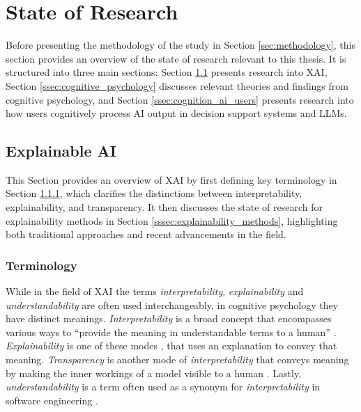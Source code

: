 \section{State of Research} \label{sec:state_of_research}

Before presenting the methodology of the study in Section \ref{sec:methodology}, this section provides an overview of the state of research relevant to this thesis. It is structured into three main sections: Section \ref{ssec:xai} presents research into \ac{XAI}, Section \ref{ssec:cognitive_psychology} discusses relevant theories and findings from cognitive psychology, and Section \ref{ssec:cognition_ai_users} presents research into how users cognitively process \ac{AI} output in decision support systems and \acp{LLM}.

\subsection{Explainable AI} \label{ssec:xai}

This Section provides an overview of \ac{XAI} by first defining key terminology in Section \ref{sssec:terminology}, which clarifies the distinctions between interpretability, explainability, and transparency. It then discusses the state of research for explainability methods in Section \ref{sssec:explainability_methods}, highlighting both traditional approaches and recent advancements in the field.

\subsubsection{Terminology} \label{sssec:terminology}

While in the field of \ac{XAI} the terms \textit{interpretability}, \textit{explainability} and \textit{understandability} are often used interchangeably, in cognitive psychology they have distinct meanings. \textit{Interpretability} is a broad concept that encompasses various ways to “provide the meaning in understandable terms to a human” \parencite{Arrieta2020}. \textit{Explainability} is one of these modes \parencite{Lipton2016}, that uses an explanation to convey that meaning. \textit{Transparency} is another mode of \textit{interpretability} that conveys meaning by making the inner workings of a model visible to a human \parencite{Arrieta2020}. Lastly, \textit{understandability} is a term often used as a synonym for \textit{interpretability} in software engineering \parencite{Alonso2018}.

